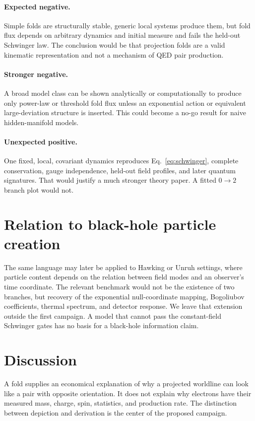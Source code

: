 \documentclass[aps,prd,reprint,nofootinbib,longbibliography]{revtex4-2}
\begin{document}
\paragraph{Expected negative.}
Simple folds are structurally stable, generic local systems produce them, but fold
flux depends on arbitrary dynamics and initial measure and fails the held-out
Schwinger law.  The conclusion would be that projection folds are a valid
kinematic representation and not a mechanism of QED pair production.

\paragraph{Stronger negative.}
A broad model class can be shown analytically or computationally to produce only
power-law or threshold fold flux unless an exponential action or equivalent
large-deviation structure is inserted.  This could become a no-go result for naive
hidden-manifold models.

\paragraph{Unexpected positive.}
One fixed, local, covariant dynamics reproduces Eq.~\eqref{eq:schwinger}, complete
conservation, gauge independence, held-out field profiles, and later quantum
signatures.  That would justify a much stronger theory paper.  A fitted $0\to2$
branch plot would not.

\section{Relation to black-hole particle creation}

The same language may later be applied to Hawking or Unruh settings, where particle
content depends on the relation between field modes and an observer's time
coordinate.  The relevant benchmark would not be the existence of two branches,
but recovery of the exponential null-coordinate mapping, Bogoliubov coefficients,
thermal spectrum, and detector response.  We leave that extension outside the
first campaign.  A model that cannot pass the constant-field Schwinger gates has no
basis for a black-hole information claim.

\section{Discussion}

A fold supplies an economical explanation of why a projected worldline can look
like a pair with opposite orientation.  It does not explain why electrons have
their measured mass, charge, spin, statistics, and production rate.  The distinction
between depiction and derivation is the center of the proposed campaign.
\end{document}
